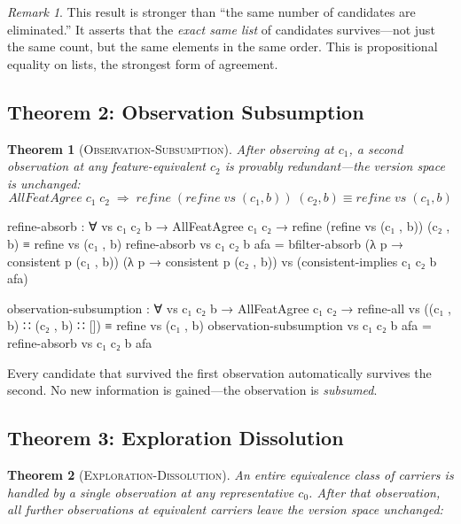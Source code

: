 \documentclass[9pt,a4paper]{article}
\theoremstyle{plain}
\newtheorem{theorem}{Theorem}
\theoremstyle{definition}
\theoremstyle{remark}
\newtheorem{remark}{Remark}
\begin{document}
\begin{remark}
This result is stronger than ``the same number of candidates are eliminated.'' It asserts that the \emph{exact same list} of candidates survives---not just the same count, but the same elements in the same order.  This is propositional equality on lists, the strongest form of agreement.
\end{remark}

\subsection{Theorem 2: Observation Subsumption}

\begin{theorem}[\textsc{Observation-Subsumption}]
After observing at $c_1$, a second observation at any feature-equivalent $c_2$ is provably redundant---the version space is unchanged:
\[
\mathit{AllFeatAgree}\;c_1\;c_2 \;\Longrightarrow\; \mathit{refine}\;(\mathit{refine}\;\mathit{vs}\;(c_1, b))\;(c_2, b) \equiv \mathit{refine}\;\mathit{vs}\;(c_1, b)
\]
\end{theorem}

\begin{code}
    refine-absorb : ∀ vs c₁ c₂ b →
      AllFeatAgree c₁ c₂ →
      refine (refine vs (c₁ , b)) (c₂ , b) ≡ refine vs (c₁ , b)
    refine-absorb vs c₁ c₂ b afa =
      bfilter-absorb
        (λ p → consistent p (c₁ , b))
        (λ p → consistent p (c₂ , b))
        vs
        (consistent-implies c₁ c₂ b afa)

    observation-subsumption : ∀ vs c₁ c₂ b →
      AllFeatAgree c₁ c₂ →
      refine-all vs ((c₁ , b) ∷ (c₂ , b) ∷ [])
        ≡ refine vs (c₁ , b)
    observation-subsumption vs c₁ c₂ b afa =
      refine-absorb vs c₁ c₂ b afa
\end{code}

\noindent Every candidate that survived the first observation automatically survives the second.  No new information is gained---the observation is \emph{subsumed}.

\subsection{Theorem 3: Exploration Dissolution}

\begin{theorem}[\textsc{Exploration-Dissolution}]
An entire equivalence class of carriers is handled by a \emph{single} observation at any representative $c_0$.  After that observation, all further observations at equivalent carriers leave the version space unchanged:
\end{theorem}
\end{document}
